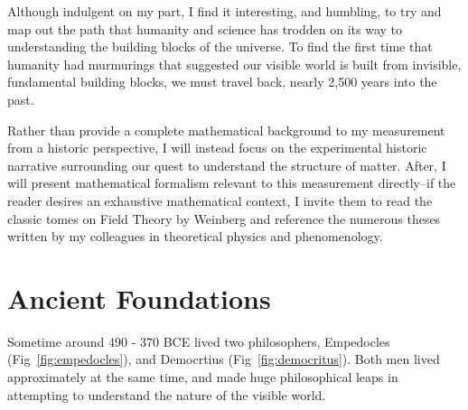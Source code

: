 Although indulgent on my part, I find it interesting, and humbling, to try and
map out the path that humanity and science has trodden on its way to
understanding the building blocks of the universe. To find the first time that
humanity had murmurings that suggested our visible world is built from
invisible, fundamental building blocks, we must travel back, nearly 2,500 years
into the past.

Rather than provide a complete mathematical background to my measurement from a
historic perspective, I will instead focus on the experimental historic
narrative surrounding our quest to understand the structure of matter. After, I
will present mathematical formalism relevant to this measurement directly--if
the reader desires an exhaustive mathematical context, I invite them to read the
classic tomes on Field Theory by Weinberg and reference the numerous theses
written by my colleagues in theoretical physics and phenomenology.

\section{Ancient Foundations}
Sometime around 490 - 370 BCE lived two philosophers, Empedocles
(Fig~\ref{fig:empedocles}), and Democrtius (Fig~\ref{fig:democritus}). Both men
lived approximately at the same time, and made huge philosophical leaps in
attempting to understand the nature of the visible world.

